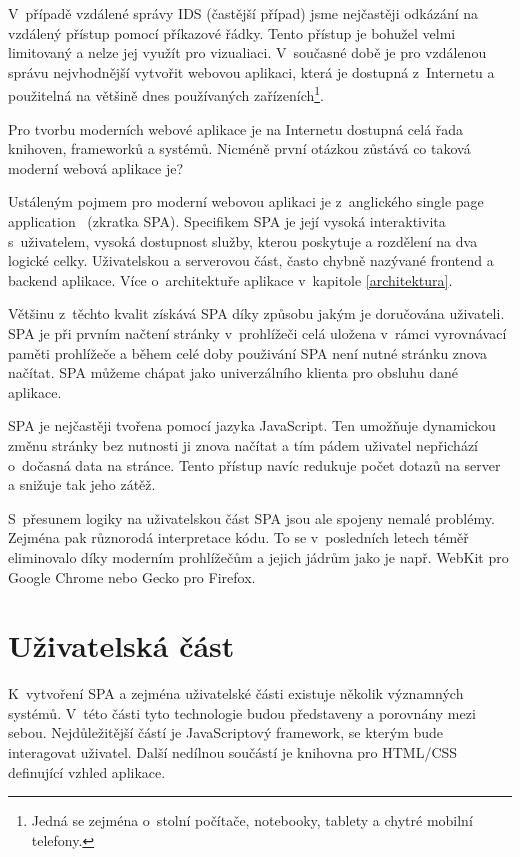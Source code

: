 V~případě vzdálené správy IDS (častější případ) jsme nejčastěji odkázání na vzdálený přístup pomocí příkazové řádky. Tento přístup je bohužel velmi limitovaný a nelze jej využít pro vizualiaci. V~současné době je pro vzdálenou správu nejvhodnější vytvořit webovou aplikaci, která je dostupná z~Internetu a použitelná na většině dnes používaných zařízeních\footnote{Jedná se zejména o~stolní počítače, notebooky, tablety a chytré mobilní telefony.}.

Pro tvorbu moderních webové aplikace je na Internetu dostupná celá řada knihoven, frameworků a systémů. Nicméně první otázkou zůstává co taková moderní webová aplikace je?

Ustáleným pojmem pro moderní webovou aplikaci je z~anglického single page application~\cite{spa} (zkratka SPA). Specifikem SPA je její vysoká interaktivita s~uživatelem, vysoká dostupnost služby, kterou poskytuje a rozdělení na dva logické celky. Uživatelskou a serverovou část, často chybně nazývané frontend a backend aplikace. Více o~architektuře aplikace v~kapitole \ref{architektura}.

Většinu z~těchto kvalit získává SPA díky způsobu jakým je doručována uživateli. SPA je při prvním načtení stránky v~prohlížeči celá uložena v~rámci vyrovnávací paměti prohlížeče a během celé doby použivání SPA není nutné stránku znova načítat. SPA můžeme chápat jako univerzálního klienta pro obsluhu dané aplikace. 

SPA je nejčastěji tvořena pomocí jazyka JavaScript. Ten umožňuje dynamickou změnu stránky bez nutnosti ji znova načítat a tím pádem uživatel nepřichází o~dočasná data na stránce. Tento přístup navíc redukuje počet dotazů na server a snižuje tak jeho zátěž.

S~přesunem logiky na uživatelskou část SPA jsou ale spojeny nemalé problémy. Zejména pak různorodá interpretace kódu. To se v~posledních letech téměř eliminovalo díky moderním prohlížečům a jejich jádrům jako je např. WebKit pro Google Chrome nebo Gecko pro Firefox.

\section{Uživatelská část}

K~vytvoření SPA a zejména uživatelské části existuje několik významných systémů. V~této části tyto technologie budou představeny a porovnány mezi sebou. Nejdůležitější částí je JavaScriptový framework, se kterým bude interagovat uživatel. Další nedílnou součástí je knihovna pro HTML/CSS definující vzhled aplikace.


